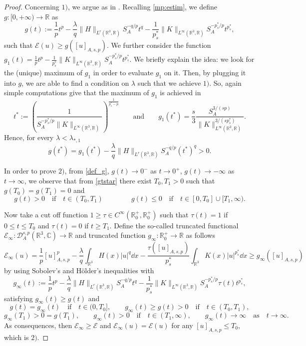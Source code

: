 \documentclass[leqno,11pt]{amsart}
\newcommand{\R}{\mathbb R}
\newcommand{\CC}{\mathbb C}
\newcommand{\cE}{{\mathcal E}}
\newcommand{\cD}{{\mathcal D}}
\numberwithin{equation}{section}
\begin{document}
\begin{proof}
Concerning $1)$, we argue as in \cite{BaldelliGuarnotta}.
Recalling \eqref{mp:estim}, we define $g:[0,+\infty) \to \R$ as 
\begin{equation}\label{def_g}
g(t):=\frac1p t^p- \frac{\lambda}{q}\|H\|_{L^r(\R^3,\R)}S_A^{-q/p}t^q-\frac{1}{p^*_s}\|K\|_{L^\infty(\R^3,\R)} S_A^{-p^*_s/p}t^{p^*_s},
\end{equation}
such that $\cE(u)\ge g([u]_{A,s,p})$.
We further consider the function $g_1(t)=\frac1p t^p-\frac{1}{p^*_s}\|K\|_{L^\infty(\R^3,\R)} S_A^{-p^*_s/p}t^{p^*_s}$. We briefly explain the idea: we look for the (unique) maximum of $g_1$ in order to evaluate $g_1$ on it. Then, by plugging it into $g$, we are able to find a condition on $\lambda$ such that we achieve $1)$. So, again simple computations give that the maximum of $g_1$ is achieved in
\begin{equation}
    t^*:=\left(\frac{1}{S_A^{-p^*_s/p}\|K\|_{L^\infty(\R^3,\R)}}\right)^{\frac{1}{p^*_s-p}}\qquad \text{and}\qquad
    g_1(t^*) = \frac{s}{3}\frac{S_A^{3/(sp)}}{\|K\|_{L^\infty(\R^3,\R)}^{3/(sp^*_s)}}.
\end{equation}
Hence, for every $\lambda < \lambda_{*,1}$
\begin{equation}\label{gtstar}
    g(t^*) = g_1(t^*)  - \frac{\lambda}{q}\|H\|_{L^r(\R^3,\R)}S_A^{-q/p}(t^*)^q > 0.
\end{equation}

In order to prove $2)$, from \eqref{def_g}, $g(t)\to 0^-$ as $t\to0^+$, $g(t)\to -\infty$ as $t\to\infty$, we observe that from \eqref{gtstar} there exist $T_0,T_1>0$ such that $g(T_0)=g(T_1)=0$ and
\begin{equation}
g(t)>0 \quad\text{if}\quad t\in (T_0,T_1) \qquad\qquad g(t)\le 0 \quad\text{if}\quad  t\in[0, T_0]\cup [T_1,\infty).
\end{equation}


Now take a cut off function $1\ge \tau\in C^\infty(\R^+_0,\R^+_0)$ such that
$\tau(t)=1$ if $0\le t\le T_0$ and $\tau(t)=0 $ if $t\ge T_1.$
Define the so-called truncated functional $\cE_\infty:\cD^{s,p}_A(\R^3,\CC)\to\R$ and truncated function $g_\infty:\R^+_0\to\R$ as follows
\begin{equation}\label{Einfty}
\cE_\infty(u)=\frac1p[u]_{A,s,p}^p-\frac{\lambda}{q}\int_{\R^3}H(x)|u|^q\dd x-\frac{ \tau([u]_{A,s,p})}{p^*_s}\int_{\R^3}K(x)|u|^{p^*_s}\dd x\ge g_\infty([u]_{A,s,p})
\end{equation}
by using Sobolev's and H\"older's inequalities with
$$g_\infty(t):=\frac1p t^p- \frac{\lambda}{q}\|H\|_{L^r(\R^3,\R)}S_A^{-q/p}t^q-\frac{1}{p^*_s}\|K\|_{L^\infty(\R^3,\R)} S_A^{-p^*_s/p}\tau(t)t^{p^*_s},$$
satisfying $g_\infty(t)\ge  g(t)$  and
$$g(t)= g_\infty(t) \quad\text{if}\quad t\in(0,T_0],\qquad g_\infty(t)\ge  g(t)>0 \quad\text{if}\quad t\in(T_0,T_1),$$
$$g_\infty(T_1)>0=g(T_1), \qquad g_\infty(t)>0 \quad\text{if}\quad t\in(T_1,\infty),\qquad g_\infty(t)\to\infty \quad\text{as}\quad t\to \infty.$$
As consequences, then $\cE_\infty\ge \cE$ and $\cE_\infty(u)= \cE(u)$ for any $[u]_{A,s,p}\le T_0$, which is $2)$.
\end{proof}
\end{document}
